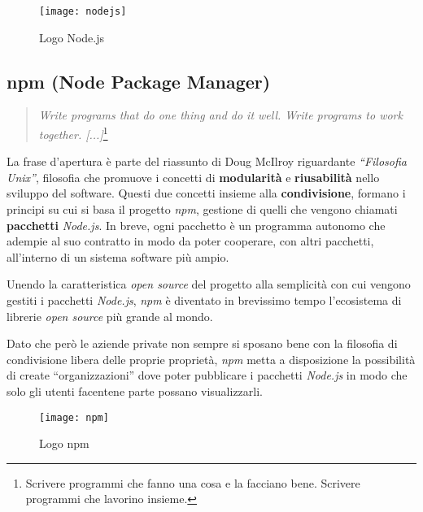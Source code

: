 \begin{figure}[H]
\begin{center}
\texttt{[image: nodejs]}
\caption{Logo Node.js}
\label{fig:nodejs_logo}
\end{center}
\end{figure}

\subsection{npm (Node Package Manager)}
\begin{quote}
\textit{Write programs that do one thing and do it well. Write programs to work
together. [...]}\footnote{Scrivere programmi che fanno una cosa e la facciano
bene. Scrivere programmi che lavorino insieme.}
\end{quote}

La frase d'apertura è parte del riassunto di Doug McIlroy riguardante
\textit{``Filosofia Unix''}, filosofia che promuove i concetti di
\textbf{modularità} e \textbf{riusabilità} nello sviluppo del software. Questi
due concetti insieme alla \textbf{condivisione}, formano i principi su cui si
basa il progetto \textit{npm}, gestione di quelli che vengono chiamati
\textbf{pacchetti} \textit{Node.js}. In breve, ogni pacchetto è un programma
autonomo che adempie al suo \gls{contratto} in modo da poter cooperare, con
altri pacchetti, all'interno di un sistema software più ampio.

Unendo la caratteristica \textit{open source} del progetto alla semplicità con
cui vengono gestiti i pacchetti \textit{Node.js}, \textit{npm} è diventato in
brevissimo tempo l'ecosistema di librerie \textit{open source} più grande al
mondo.

Dato che però le aziende private non sempre si sposano bene con la filosofia di
condivisione libera delle proprie proprietà, \textit{npm} metta a disposizione
la possibilità di create ``organizzazioni'' dove poter pubblicare i pacchetti
\textit{Node.js} in modo che solo gli utenti facentene parte possano
visualizzarli.

\begin{figure}[H]
\begin{center}
\texttt{[image: npm]}
\caption{Logo npm}
\label{fig:npm_logo}
\end{center}
\end{figure}

